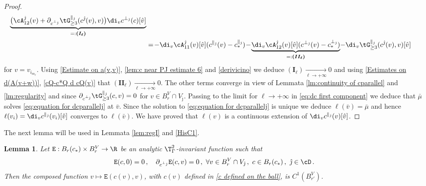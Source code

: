 \documentclass[11pt,a4paper,reqno]{article}
\numberwithin{equation}{section}
\newtheorem{lemma}[theorem]{Lemma}
\theoremstyle{definition}
\begin{document}
\begin{proof}
\begin{equation}
\begin{aligned}
        \underbrace{\big(\cA^{\hat \jmath}_{12}(v)+\partial_{c^{\bot_{\hat \jmath}}}\tG^{\parallel_{\hat \jmath}}_{\geq 3}(c^{\hat \jmath}(v),v)\big)\di_v c^{\bot_{\hat \jmath}}(c)[\hat v]}_{=:\boldsymbol{(I_\ell)}}\\
       & =\! - \di_v \cA^{\hat \jmath}_{11}(v)[\hat v](c^{\parallel_{\hat \jmath}}(v)-c_*^{\parallel_{\hat \jmath}})
       \! - \!\underbrace{\di_v \cA^{\hat \jmath}_{12}(v)[\hat v](c^{\bot_{\hat \jmath}}(v)-c_*^{\bot_{\hat \jmath}})}_{
        =: \boldsymbol{(II_\ell)} } \! - \di_v \tG^{\parallel_{\hat \jmath}}_{\geq 3}(c^{\hat \jmath}(v),v)[\hat v]
    \end{aligned}
    \end{equation}
    for $v=v_{i_{m_\ell}}$.
    Using \eqref{Estimate on a(v,v)}, \eqref{lem:c near PJ estimate 6} and \eqref{derivicino} we deduce $\boldsymbol{(I_\ell)}\xrightarrow[\ell\to +\infty]{} 0$ and using \eqref{Estimates on d(A(v+w))}, \eqref{cQ-c*Q d cQ(v)} that $\boldsymbol{(II_\ell)}\xrightarrow[\ell\to +\infty]{} 0$.
    The other terms converge in view of Lemmata \ref{lm:continuity of cparallel} and \ref{lm:regularity} and since $\partial_{c^{\bot_{\hat \jmath}}}\tG^{\parallel_{\hat \jmath}}_{\geq 3}(c,v)=0 $ for $v\in B_{r}^V\cap V_{\hat \jmath}$.
    Passing to the limit for $\ell \to +\infty$ in \eqref{eq:dc first component} we deduce that $\bar \mu$ solves \eqref{eq:equation for dcparallelj} at $ \bar v $. 
    Since the solution to \eqref{eq:equation for dcparallelj} is unique we deduce $\ell(\bar v)=\bar \mu$ and hence $\ell(v_i)=\di_v c^{\parallel_{\hat \jmath}}(v_i)[\hat v]$ converges to $\ell(\bar v)$.
    We have proved that $\ell(v)$ is a continuous extension of $\di_v c^{\parallel_{\hat \jmath}}(v)[\hat v]$.
    \end{proof}

   The next  lemma  will be used  in Lemmata \ref{lem:regI}
    and \ref{HisC1}. 
    
    \begin{lemma}\label{lm:regularity 1}
        Let $ {\mathtt E} :B_{r}(c_*)\times B_{r}^V\to \R$ be an analytic
    $ \T^2_{\Gamma}$-invariant 
    function such that 
\begin{equation}\label{assuC1}
         {\mathtt E} (c,0)=0  \, , \quad  \partial_{c^{\bot_{\hat \jmath}}} {\mathtt E} (c,v)=0 \, ,  \  
        \forall v\in B_{r}^V\cap V_{\hat \jmath}\, , \   c\in B_{r}(c_*) \,, \ {\hat \jmath} \in \cD\, .
        \end{equation}
        Then the composed function $v\mapsto {\mathtt E} (c(v),v)$, with $ c(v) $ defined in 
        \eqref{c defined on the ball},   is $C^1 (B_{r'}^V) $.
    \end{lemma}
    
\end{document}
